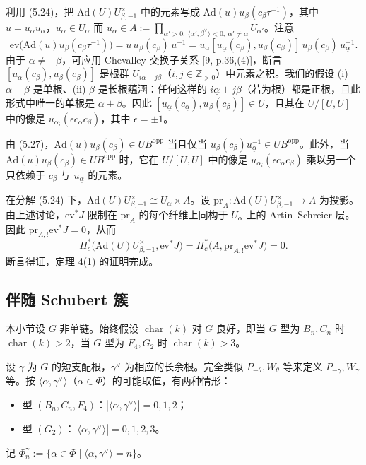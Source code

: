 利用 (5.24)，把 $\mathrm{Ad}(U)U^\times_{\beta,-1}$ 中的元素写成 $\mathrm{Ad}(u)u_\beta(c_\beta\tau^{-1})$，其中 $u=u_\alpha u_{\underline\alpha}$，$u_\alpha\in U_\alpha$ 而 $u_{\underline\alpha}\in A:=\prod_{\alpha'>0,\ \langle\alpha',\beta^\vee\rangle<0,\ \alpha'\neq\alpha}U_{\alpha'}$。注意
\begin{equation}
\mathrm{ev}\big(\mathrm{Ad}(u)u_\beta(c_\beta\tau^{-1})\big)=u\,u_\beta(c_\beta)\,u^{-1}=u_\alpha[u_{\underline\alpha}(c_\beta),u_\beta(c_\beta)]\,u_\beta(c_\beta)\,u_{\underline\alpha}^{-1}.
\end{equation}
由于 $\alpha\neq\pm\beta$，可应用 Chevalley 交换子关系 [9, p.36,(4)]，断言 $[u_{\underline\alpha}(c_\beta),u_\beta(c_\beta)]$ 是根群 $U_{i\underline\alpha+j\beta}$（$i,j\in\mathbb{Z}_{>0}$）中元素之积。我们的假设 (i) $\alpha+\beta$ 是单根、(ii) $\beta$ 是长根蕴涵：任何这样的 $i\underline\alpha+j\beta$（若为根）都是正根，且此形式中唯一的单根是 $\alpha+\beta$。因此 $[u_{\underline\alpha}(c_{\underline\alpha}),u_\beta(c_\beta)]\in U$，且其在 $U/[U,U]$ 中的像是 $u_{\alpha_i}(\epsilon c_{\underline\alpha}c_\beta)$，其中 $\epsilon=\pm 1$。

由 (5.27)，$\mathrm{Ad}(u)u_\beta(c_\beta)\in UB^{\mathrm{opp}}$ 当且仅当 $u_\beta(c_\beta)u_{\underline\alpha}^{-1}\in UB^{\mathrm{opp}}$。此外，当 $\mathrm{Ad}(u)u_\beta(c_\beta)\in UB^{\mathrm{opp}}$ 时，它在 $U/[U,U]$ 中的像是 $u_{\alpha_i}(\epsilon c_{\underline\alpha}c_\beta)$ 乘以另一个只依赖于 $c_\beta$ 与 $u_{\underline\alpha}$ 的元素。

在分解 (5.24) 下，$\mathrm{Ad}(U)U^\times_{\beta,-1}\cong U_\alpha\times A$。设 $\mathrm{pr}_A:\mathrm{Ad}(U)U^\times_{\beta,-1}\to A$ 为投影。由上述讨论，$\mathrm{ev}^*J$ 限制在 $\mathrm{pr}_A$ 的每个纤维上同构于 $U_\alpha$ 上的 Artin--Schreier 层。因此 $\mathrm{pr}_{A,!}\mathrm{ev}^*J=0$，从而
\[
H^*_c\big(\mathrm{Ad}(U)U^\times_{\beta,-1},\mathrm{ev}^*J\big)=H^*_c\big(A,\mathrm{pr}_{A,!}\mathrm{ev}^*J\big)=0.
\]
断言得证，定理 4(1) 的证明完成。

\subsection{伴随 Schubert 簇}

本小节设 $G$ 非单链。始终假设 $\operatorname{char}(k)$ 对 $G$ 良好，即当 $G$ 型为 $B_n,C_n$ 时 $\operatorname{char}(k)>2$，当 $G$ 型为 $F_4,G_2$ 时 $\operatorname{char}(k)>3$。

设 $\gamma$ 为 $G$ 的短支配根，$\gamma^\vee$ 为相应的长余根。完全类似 $P_{-\theta},W_\theta$ 等来定义 $P_{-\gamma},W_\gamma$ 等。按 $\langle\alpha,\gamma^\vee\rangle$（$\alpha\in\Phi$）的可能取值，有两种情形：
\begin{itemize}[leftmargin=1.6em, itemsep=.15em]
\item 型 $(B_n,C_n,F_4)$：$|\langle\alpha,\gamma^\vee\rangle|=0,1,2$；
\item 型 $(G_2)$：$|\langle\alpha,\gamma^\vee\rangle|=0,1,2,3$。
\end{itemize}
记 $\Phi^\gamma_n:=\{\alpha\in\Phi\mid\langle\alpha,\gamma^\vee\rangle=n\}$。

